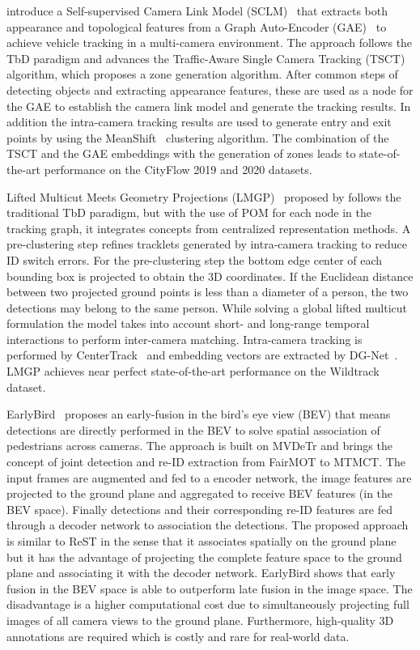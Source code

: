 \citeauthor{Hsu22} introduce a Self-supervised Camera Link Model (SCLM)~\cite{Hsu22} that extracts both appearance and topological features from a Graph Auto-Encoder (GAE)~\cite{Kipf16} to achieve vehicle tracking in a multi-camera environment. The approach follows the TbD paradigm and advances the Traffic-Aware Single Camera Tracking (TSCT)~\cite{Hsu20} algorithm, which proposes a zone generation algorithm. After common steps of detecting objects and extracting appearance features, these are used as a node for the GAE to establish the camera link model and generate the tracking results. In addition the intra-camera tracking results are used to generate entry and exit points by using the MeanShift~\cite{Comaniciu02} clustering algorithm. The combination of the TSCT and the GAE embeddings with the generation of zones leads to state-of-the-art performance on the CityFlow 2019 and 2020 datasets.

Lifted Multicut Meets Geometry Projections (LMGP)~\cite{Nguyen22a} proposed by \citeauthor{Nguyen22a} follows the traditional TbD paradigm, but with the use of POM for each node in the tracking graph, it integrates concepts from centralized representation methods. A pre-clustering step refines tracklets generated by intra-camera tracking to reduce ID switch errors. For the pre-clustering step the bottom edge center of each bounding box is projected to obtain the 3D coordinates. If the Euclidean distance between two projected ground points is less than a diameter of a person, the two detections may belong to the same person. While solving a global lifted multicut formulation the model takes into account short- and long-range temporal interactions  to perform inter-camera matching. Intra-camera tracking is performed by CenterTrack~\cite{Zhou20} and embedding vectors are extracted by DG-Net~\cite{Zheng19}. LMGP achieves near perfect state-of-the-art performance on the Wildtrack dataset.

EarlyBird~\cite{Teepe23} proposes an early-fusion in the bird's eye view (BEV) that means detections are directly performed in the BEV to solve spatial association of pedestrians across cameras. The approach is built on MVDeTr and brings the concept of joint detection and re-ID extraction from FairMOT to MTMCT. The input frames are augmented and fed to a encoder network, the image features are projected to the ground plane and aggregated to receive BEV features (in the BEV space). Finally detections and their corresponding re-ID features are fed through a decoder network to association the detections. The proposed approach is similar to ReST in the sense that it associates spatially on the ground plane but it has the advantage of projecting the complete feature space to the ground plane and associating it with the decoder network. EarlyBird shows that early fusion in the BEV space is able to outperform late fusion in the image space. The disadvantage is a higher computational cost due to simultaneously projecting full images of all camera views to the ground plane. Furthermore, high-quality 3D annotations are required which is costly and rare for real-world data.

